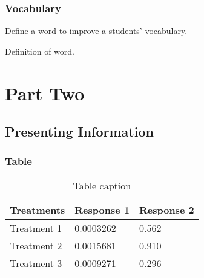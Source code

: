 \documentclass[11pt,fleqn]{book} %
\begin{document}

\section{Vocabulary}

Define a word to improve a students' vocabulary.

\begin{vocabulary}[Word]
    Definition of word.
\end{vocabulary}


\part{Part Two}



\chapter{Presenting Information}

\section{Table}

\begin{table}[h]
    \centering
    \begin{tabular}{l l l}
        \toprule
        \textbf{Treatments} & \textbf{Response 1} & \textbf{Response 2} \\
        \midrule
        Treatment 1         & 0.0003262           & 0.562               \\
        Treatment 2         & 0.0015681           & 0.910               \\
        Treatment 3         & 0.0009271           & 0.296               \\
        \bottomrule
    \end{tabular}
    \caption{Table caption}
\end{table}
\end{document}
